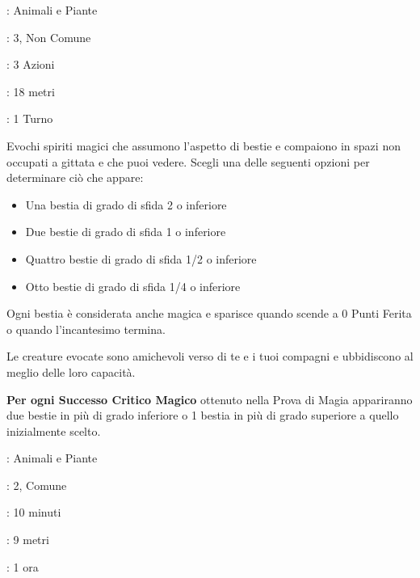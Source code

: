 \begin{multicols}{2}
\noindent\colorbox{OBSSgold!10}{
\begin{minipage}{0.95\linewidth}
\begin{description}[noitemsep, topsep=0pt, parsep=0pt, partopsep=0pt, leftmargin=0cm, labelwidth=1.3cm]
	\item[\textbf{Lista}]: Animali e Piante
	\item[\textbf{Livello}]: 3, Non Comune
	\item[\textbf{Lancio}]: 3 Azioni
	\item[\textbf{Gittata}]: 18 metri
	\item[\textbf{Durata}]: 1 Turno
\end{description}
\end{minipage}}\smallskip

Evochi spiriti magici che assumono l'aspetto di bestie e compaiono in spazi non occupati a gittata e che puoi vedere. Scegli una delle seguenti opzioni per determinare ciò che appare:

\begin{itemize}[leftmargin=*] \setlength{\itemsep}{-1pt}
	\item Una bestia di grado di sfida 2 o inferiore
	\item Due bestie di grado di sfida 1 o inferiore
	\item Quattro bestie di grado di sfida 1/2 o inferiore
	\item Otto bestie di grado di sfida 1/4 o inferiore
\end{itemize}

Ogni bestia è considerata anche magica e sparisce quando scende a 0 Punti Ferita o quando l'incantesimo termina.

Le creature evocate sono amichevoli verso di te e i tuoi compagni e ubbidiscono al meglio delle loro capacità.

\textbf{Per ogni Successo Critico Magico} ottenuto nella Prova di Magia appariranno due bestie in più di grado inferiore o 1 bestia in più di grado superiore a quello inizialmente scelto.

\noindent\colorbox{OBSSgold!10}{
\begin{minipage}{0.95\linewidth}
\begin{description}[noitemsep, topsep=0pt, parsep=0pt, partopsep=0pt, leftmargin=0cm, labelwidth=1.3cm]
	\item[\textbf{Lista}]: Animali e Piante
	\item[\textbf{Livello}]: 2, Comune
	\item[\textbf{Lancio}]: 10 minuti
	\item[\textbf{Gittata}]: 9 metri
	\item[\textbf{Durata}]: 1 ora
\end{description}
\end{minipage}}\smallskip


\end{multicols}
